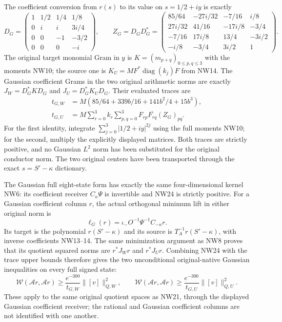 \documentclass[11pt]{article}
\providecommand{\W}{\mathcal W}
\newcommand{\diag}{\operatorname{diag}}
\begin{document}
The coefficient conversion from $r(s)$ to its value on
$s=1/2+iy$ is exactly
\[
 D_G=\begin{pmatrix}
 1&1/2&1/4&1/8\\0&i&i&3i/4\\0&0&-1&-3/2\\0&0&0&-i
 \end{pmatrix},\qquad
 Z_G=D_GD_G^*=
 \begin{pmatrix}
 85/64&-27i/32&-7/16&i/8\\
 27i/32&41/16&-17i/8&-3/4\\
 -7/16&17i/8&13/4&-3i/2\\
 -i/8&-3/4&3i/2&1
 \end{pmatrix}.
 \tag{NW25}
\]
The original target monomial Gram in $y$ is
$K=(m_{p+q})_{0\le p,q\le3}$ with the moments NW10;
the source one is $K_U=MF^*\diag(k_j)F$ from NW14.
The Gaussian coefficient Grams in the two original
arithmetic norms are exactly $J_W=D_G^*KD_G$ and
$J_U=D_G^*K_UD_G$. Their evaluated traces are
\[
\boxed{\begin{aligned}
 t_{G,W}&=M(85/64+339b/16+141b^2/4+15b^3),\\
 t_{G,U}&=M\sum_{r=0}^3k_r\sum_{p,q=0}^3
                         F_{rp}\overline{F_{rq}}(Z_G)_{pq}.
\end{aligned}}\tag{NW26}
\]
For the first identity, integrate
$\sum_{j=0}^3|1/2+iy|^{2j}$ using the full moments NW10;
for the second, multiply the explicitly displayed matrices.
Both traces are strictly positive, and no Gaussian
$L^2$ norm has been substituted for the original conductor
norm. The two original centers have been transported
through the exact $s=S'-\kappa$ dictionary.

The Gaussian full eight-state form has exactly the same
four-dimensional kernel NW6: its coefficient receiver
$C_\kappa\Psi$ is invertible and NW24 is strictly positive.
For a Gaussian coefficient column $r$, the actual
orthogonal minimum lift in either original norm is
\[
 \ell_G(r)=\iota_-O^{-1}\Psi^{-1}C_{-\kappa}r.
 \tag{NW27}
\]
Its target is the polynomial $r(S'-\kappa)$ and its
source is $T_A^{-1}r(S'-\kappa)$, with inverse coefficients
NW13--14. The same minimization argument as NW8 proves
that its quotient squared norms are $r^*J_Wr$ and
$r^*J_Ur$. Combining NW24 with the trace upper bounds
therefore gives the two unconditional original-native
Gaussian inequalities on every full signed state:
\[
\boxed{\quad
 \W(\mathcal A r,\mathcal A r)
 \ge\frac{e^{-300}}{t_{G,W}}\|[v]\|_{Q,W}^2,
 \qquad
 \W(\mathcal A r,\mathcal A r)
 \ge\frac{e^{-300}}{t_{G,U}}\|[v]\|_{Q,U}^2.
 \quad}\tag{NW28}
\]
These apply to the same original quotient spaces as NW21,
through the displayed Gaussian coefficient receiver; the
rational and Gaussian coefficient columns are not
identified with one another.
\end{document}

